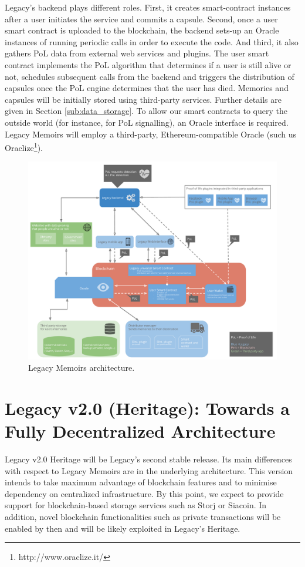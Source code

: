 Legacy’s backend plays different roles. First, it creates smart-contract instances after a user initiates the service and commits a capsule. Second, once a user smart contract is uploaded to the blockchain, the backend sets-up an Oracle instances of running periodic calls in order to execute the code. And third, it also gathers PoL data from external web services and plugins. The user smart contract implements the PoL algorithm that determines if a user is still alive or not, schedules subsequent calls from the backend and triggers the distribution of capsules once the PoL engine determines that the user has died. 
Memories and capsules will be initially stored using third-party services. Further details are given in Section \ref{sub:data_storage}.
To allow our smart contracts to query the outside world (for instance, for PoL signalling), an Oracle interface is required. Legacy Memoirs will employ a third-party, Ethereum-compatible Oracle (such us Oraclize\footnote{http://www.oraclize.it/}).

\begin{figure}[h]
  \centering
  \includegraphics[scale=0.3]{fig/architecture_v02_hybrid}
  \caption{Legacy Memoirs architecture.}
  \label{fig:leg_v1_arch}
\end{figure} 


\section{Legacy v2.0 (Heritage): Towards a Fully Decentralized Architecture} %
\label{sec:legacy_v2_0_heritage_towards_a_fully_decentralized_architecture}
Legacy v2.0 Heritage will be Legacy’s second stable release. Its main differences with respect to Legacy Memoirs are in the underlying architecture. This version intends to take maximum advantage of blockchain features and to minimise dependency on centralized infrastructure.
By this point, we expect to provide support for blockchain-based storage services such as Storj or Siacoin.
In addition, novel blockchain functionalities such as private transactions will be enabled by then and will be likely exploited in Legacy's Heritage. 

